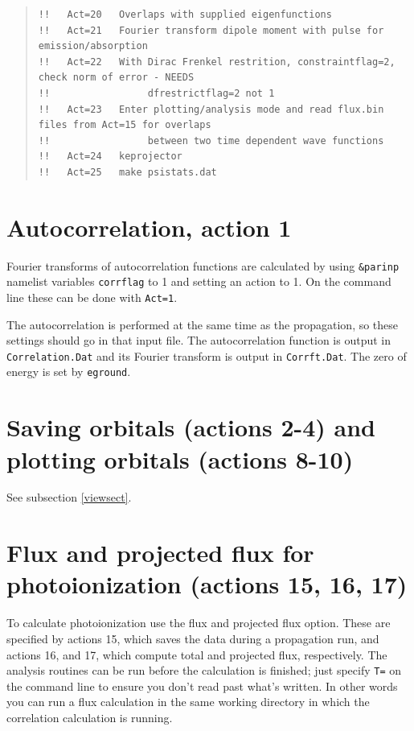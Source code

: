 \documentclass[10pt,leqno, oneside]{book}
\begin{document}
\begin{quote}
{\begin{verbatim}
!!   Act=20   Overlaps with supplied eigenfunctions                                                                                      
!!   Act=21   Fourier transform dipole moment with pulse for emission/absorption                                                         
!!   Act=22   With Dirac Frenkel restrition, constraintflag=2, check norm of error - NEEDS                                               
!!                 dfrestrictflag=2 not 1                                                                                                
!!   Act=23   Enter plotting/analysis mode and read flux.bin files from Act=15 for overlaps                                              
!!                 between two time dependent wave functions                                                                             
!!   Act=24   keprojector  
!!   Act=25   make psistats.dat
\end{verbatim}}
\end{quote}


\section{Autocorrelation, action 1}

Fourier transforms of autocorrelation functions are calculated by using \verb#&parinp# namelist variables \verb#corrflag# to 1 and setting an action to 1.  On the command line these can be done with \verb#Act=1#.   

The autocorrelation is performed at the same time as the propagation, so these settings should go in that input file.
 The autocorrelation function is output in \verb#Correlation.Dat# and its Fourier transform is output in \verb#Corrft.Dat#.  The zero of energy is set by \verb#eground#.

\section{Saving orbitals (actions 2-4) and plotting orbitals (actions 8-10)}


See subsection \ref{viewsect}.


\section{Flux and projected flux for photoionization (actions 15, 16, 17)}

To calculate photoionization use the flux and projected flux option.  These are specified by actions 15, which saves the data during a propagation run, and actions 16, and 17, which compute total and projected flux, respectively.  The analysis routines can be run before the calculation is finished; just specify \verb#T=# on the command line to ensure you don't read past what's written.  In other words you can run a flux calculation in the same working directory in which the correlation 
calculation is running.
\end{document}
